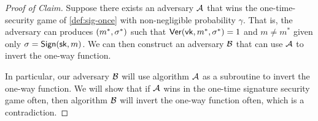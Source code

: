 \begin{proof}[Proof of Claim]
Suppose there exists an adversary $\mathcal{A}$ that wins the 
one-time-security game of \cref{def:sig-once} with non-negligible probability $\gamma$.
That is, the adversary can produces $(m^*, \sigma^*)$ such that $\mathsf{Ver}(\mathsf{vk}, m^*, \sigma^*) = 1$ and $m \neq m^*$ given only $\sigma = \mathsf{Sign}({\mathsf{sk}}, m)$.
We can then construct an adversary $\mathcal{B}$ that can use $\mathcal{A}$ to 
invert the one-way function.


In particular, our adversary $\mathcal{B}$ will use algorithm $\mathcal{A}$
as a subroutine to invert the one-way function.
We will show that if $\mathcal{A}$ wins in the one-time signature security
game often, then algorithm $\mathcal{B}$ will invert the one-way function
often, which is a contradiction.


\end{proof}
